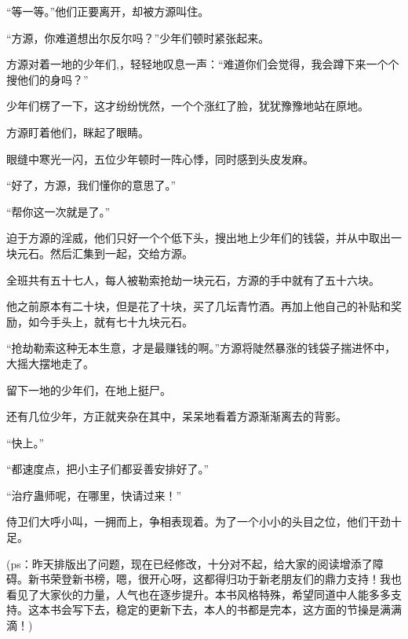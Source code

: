\begin{this_body}
“等一等。”他们正要离开，却被方源叫住。

“方源，你难道想出尔反尔吗？”少年们顿时紧张起来。

方源对着一地的少年们,，轻轻地叹息一声：“难道你们会觉得，我会蹲下来一个个搜他们的身吗？”

少年们楞了一下，这才纷纷恍然，一个个涨红了脸，犹犹豫豫地站在原地。

方源盯着他们，眯起了眼睛。

眼缝中寒光一闪，五位少年顿时一阵心悸，同时感到头皮发麻。

“好了，方源，我们懂你的意思了。”

“帮你这一次就是了。”

迫于方源的淫威，他们只好一个个低下头，搜出地上少年们的钱袋，并从中取出一块元石。然后汇集到一起，交给方源。

全班共有五十七人，每人被勒索抢劫一块元石，方源的手中就有了五十六块。

他之前原本有二十块，但是花了十块，买了几坛青竹酒。再加上他自己的补贴和奖励，如今手头上，就有七十九块元石。

“抢劫勒索这种无本生意，才是最赚钱的啊。”方源将陡然暴涨的钱袋子揣进怀中，大摇大摆地走了。

留下一地的少年们，在地上挺尸。

还有几位少年，方正就夹杂在其中，呆呆地看着方源渐渐离去的背影。

“快上。”

“都速度点，把小主子们都妥善安排好了。”

“治疗蛊师呢，在哪里，快请过来！”

侍卫们大呼小叫，一拥而上，争相表现着。为了一个小小的头目之位，他们干劲十足。

(ps：昨天排版出了问题，现在已经修改，十分对不起，给大家的阅读增添了障碍。新书荣登新书榜，嗯，很开心呀，这都得归功于新老朋友们的鼎力支持！我也看见了大家伙的力量，人气也在逐步提升。本书风格特殊，希望同道中人能多多支持。这本书会写下去，稳定的更新下去，本人的书都是完本，这方面的节操是满满滴！)

\end{this_body}

